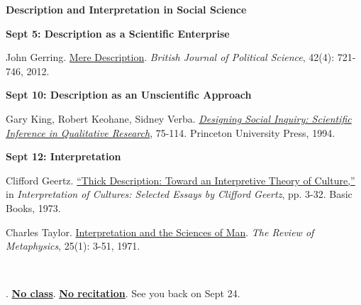 \documentclass[letterpaper]{article}
\renewenvironment{itemize}{
  \begin{list}{}{
    \setlength{\leftmargin}{1.5em}
  }
}{
  \end{list}
}
\begin{document}
\begin{enumerate}
\item {\bf Description and Interpretation in Social Science}
		
		\begin{itemize}
		\item {\bf Sept 5: Description as a Scientific Enterprise}
			\begin{itemize}
					\item[$\bullet$] John Gerring. \href{http://www.jstor.org/stable/23274165}{Mere Description}. \emph{British Journal of Political Science}, 42(4): 721-746, 2012. 
		\end{itemize}
		\end{itemize}


		\begin{itemize}
		\item {\bf Sept 10: Description as an Unscientific Approach}
			\begin{itemize}
					\item[$\bullet$] Gary King, Robert Keohane, Sidney Verba. \href{https://sites.duke.edu/niou/files/2014/06/king94book.pdf}{\emph{Designing Social Inquiry: Scientific Inference in Qualitative Research}}, 75-114. Princeton University Press, 1994.
			\end{itemize}
		\end{itemize}

		\begin{itemize}
		\item {\bf Sept 12: Interpretation}
			\begin{itemize}
					\item[$\bullet$] Clifford Geertz. \href{https://quod.lib.umich.edu/cache/h/e/b/heb01005.0001.001/00000011.tif.30.pdf#page=3;zoom=75}{``Thick Description: Toward an Interpretive Theory of Culture,''} in \emph{Interpretation of Cultures: Selected Essays by Clifford Geertz}, pp. 3-32. Basic Books, 1973. 
					\item[$\bullet$] Charles Taylor. \href{http://www.jstor.org/stable/20125928}{Interpretation and the Sciences of Man}. \emph{The Review of Metaphysics}, 25(1): 3-51, 1971.
			\end{itemize}
		\end{itemize}

~\\
\item[] \begin{center}{\color{blue}{\bf National Holiday}. {\bf \underline{No class}}. {\bf \underline{No recitation}}. See you back on Sept 24.}\end{center}
~\\


\end{enumerate}
\end{document}
